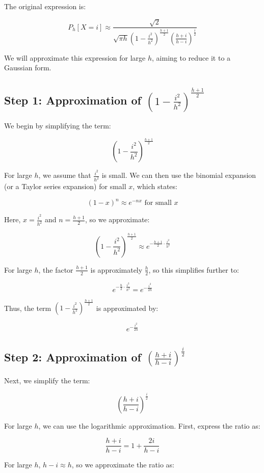 \documentclass{article}
\begin{document}
The original expression is:

\[
P_h[X = i] \approx \frac{\sqrt{2}}{\sqrt{\pi h} \left( 1 - \frac{i^2}{h^2} \right)^{\frac{h+1}{2}} \left( \frac{h + i}{h - i} \right)^{\frac{i}{2}}}
\]

We will approximate this expression for large $h$, aiming to reduce it to a Gaussian form.

\subsection*{Step 1: Approximation of $\left( 1 - \frac{i^2}{h^2} \right)^{\frac{h+1}{2}}$}

We begin by simplifying the term:

\[
\left( 1 - \frac{i^2}{h^2} \right)^{\frac{h+1}{2}}
\]

For large $h$, we assume that $\frac{i^2}{h^2}$ is small. We can then use the binomial expansion (or a Taylor series expansion) for small $x$, which states:

\[
(1 - x)^n \approx e^{-nx} \text{ for small } x
\]

Here, $x = \frac{i^2}{h^2}$ and $n = \frac{h+1}{2}$, so we approximate:

\[
\left( 1 - \frac{i^2}{h^2} \right)^{\frac{h+1}{2}} \approx e^{-\frac{h+1}{2} \cdot \frac{i^2}{h^2}}
\]

For large $h$, the factor $\frac{h+1}{2}$ is approximately $\frac{h}{2}$, so this simplifies further to:

\[
e^{-\frac{h}{2} \cdot \frac{i^2}{h^2}} = e^{-\frac{i^2}{2h}}
\]

Thus, the term $\left( 1 - \frac{i^2}{h^2} \right)^{\frac{h+1}{2}}$ is approximated by:

\[
e^{-\frac{i^2}{2h}}
\]

\subsection*{Step 2: Approximation of $\left( \frac{h+i}{h-i} \right)^{\frac{i}{2}}$}

Next, we simplify the term:

\[
\left( \frac{h+i}{h-i} \right)^{\frac{i}{2}}
\]

For large $h$, we can use the logarithmic approximation. First, express the ratio as:

\[
\frac{h+i}{h-i} = 1 + \frac{2i}{h-i}
\]

For large $h$, $h-i \approx h$, so we approximate the ratio as:
\end{document}
